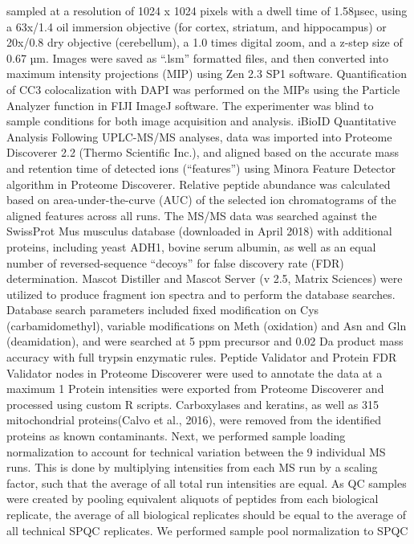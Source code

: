 sampled at a resolution of 1024 x 1024 pixels with a dwell time of 1.58µsec,
using a 63x/1.4 oil immersion objective (for cortex, striatum, and hippocampus)
or 20x/0.8 dry objective (cerebellum), a 1.0 times digital zoom, and a z-step
size of 0.67 µm. Images were saved as “.lsm” formatted files, and then converted
into maximum intensity projections (MIP) using Zen 2.3 SP1 software.
Quantification of CC3 colocalization with DAPI was performed on the MIPs using
the Particle Analyzer function in FIJI ImageJ software. The experimenter was
blind to sample conditions for both image acquisition and analysis. 
iBioID Quantitative Analysis
Following UPLC-MS/MS analyses, data was imported into Proteome Discoverer 2.2
(Thermo Scientific Inc.), and aligned based on the accurate mass and retention
time of detected ions (“features”) using Minora Feature Detector algorithm in
Proteome Discoverer. Relative peptide abundance was calculated based on
area-under-the-curve (AUC) of the selected ion chromatograms of the aligned
features across all runs. The MS/MS data was searched against the SwissProt Mus
musculus database (downloaded in April 2018) with additional proteins, including
yeast ADH1, bovine serum albumin, as well as an equal number of
reversed-sequence “decoys” for false discovery rate (FDR) determination. Mascot
Distiller and Mascot Server (v 2.5, Matrix Sciences) were utilized to produce
fragment ion spectra and to perform the database searches. Database search
parameters included fixed modification on Cys (carbamidomethyl), variable
modifications on Meth (oxidation) and Asn and Gln (deamidation), and were
searched at 5 ppm precursor and 0.02 Da product mass accuracy with full trypsin
enzymatic rules. Peptide Validator and Protein FDR Validator nodes in Proteome
Discoverer were used to annotate the data at a maximum 1%
	Protein intensities were exported from Proteome Discoverer and processed
using custom R scripts. Carboxylases and keratins, as well as 315 mitochondrial
proteins(Calvo et al., 2016), were removed from the identified proteins as known
contaminants. Next, we performed sample loading normalization to account for
technical variation between the 9 individual MS runs. This is done by
multiplying intensities from each MS run by a scaling factor, such that the
average of all total run intensities are equal. As QC samples were created by
pooling equivalent aliquots of peptides from each biological replicate, the
average of all biological replicates should be equal to the average of all
technical SPQC replicates. We performed sample pool normalization to SPQC
